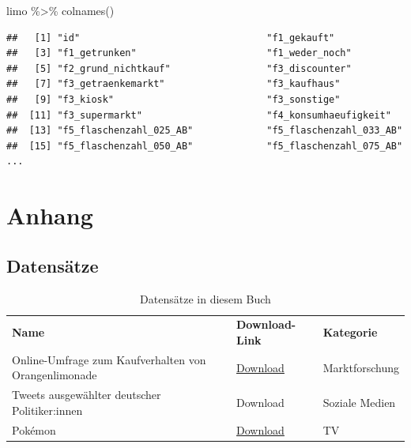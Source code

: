 \documentclass[
]{book}
\newenvironment{Shaded}{\begin{snugshade}}{\end{snugshade}}
\newcommand{\FunctionTok}[1]{\textcolor[rgb]{0.00,0.00,0.00}{#1}}
\newcommand{\NormalTok}[1]{#1}
\newcommand{\SpecialCharTok}[1]{\textcolor[rgb]{0.00,0.00,0.00}{#1}}
\begin{document}
\begin{Shaded}
\begin{Highlighting}[]
\NormalTok{limo }\SpecialCharTok{\%\textgreater{}\%} \FunctionTok{colnames}\NormalTok{()}
\end{Highlighting}
\end{Shaded}

\begin{verbatim}
##   [1] "id"                                 "f1_gekauft"                        
##   [3] "f1_getrunken"                       "f1_weder_noch"                     
##   [5] "f2_grund_nichtkauf"                 "f3_discounter"                     
##   [7] "f3_getraenkemarkt"                  "f3_kaufhaus"                       
##   [9] "f3_kiosk"                           "f3_sonstige"                       
##  [11] "f3_supermarkt"                      "f4_konsumhaeufigkeit"              
##  [13] "f5_flaschenzahl_025_AB"             "f5_flaschenzahl_033_AB"            
##  [15] "f5_flaschenzahl_050_AB"             "f5_flaschenzahl_075_AB"            
...
\end{verbatim}

\hypertarget{part-anhang}{%
\part*{Anhang}\label{part-anhang}}

\hypertarget{datensaetze}{%
\chapter*{Datensätze}\label{datensaetze}}

\begin{longtable}[]{@{}
  >{\raggedright\arraybackslash}p{}
  >{\raggedright\arraybackslash}p{}
  >{\raggedright\arraybackslash}p{}@{}}
\caption{Datensätze in diesem Buch}\tabularnewline
\toprule
\endhead
\textbf{Name} & \textbf{Download-Link} & \textbf{Kategorie} \\
Online-Umfrage zum Kaufverhalten von Orangenlimonade & \href{datasets/limonade.csv}{Download} & Marktforschung \\
Tweets ausgewählter deutscher Politiker:innen & Download & Soziale Medien \\
Pokémon & \href{datasets/pokemon.csv}{Download} & TV \\
\bottomrule
\end{longtable}

  
\end{document}

